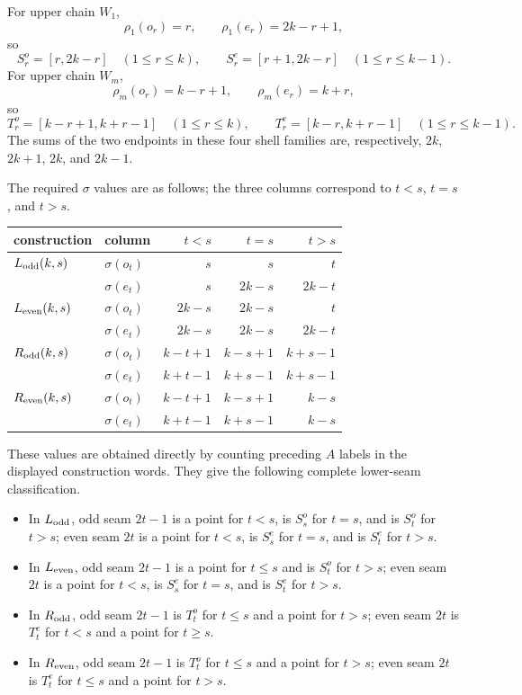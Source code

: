 \documentclass[11pt]{article}
\theoremstyle{definition}
\theoremstyle{remark}
\providecommand{\tightlist}{\setlength{\itemsep}{0pt}\setlength{\parskip}{0pt}}
\begin{document}
For upper chain $W_1$,
\[
\rho_1(o_r)=r,\qquad \rho_1(e_r)=2k-r+1,
\]
so
\[
S_r^o=[r,2k-r]\quad(1\le r\le k),\qquad
S_r^e=[r+1,2k-r]\quad(1\le r\le k-1).
\]
For upper chain $W_m$,
\[
\rho_m(o_r)=k-r+1,\qquad \rho_m(e_r)=k+r,
\]
so
\[
T_r^o=[k-r+1,k+r-1]\quad(1\le r\le k),\qquad
T_r^e=[k-r,k+r-1]\quad(1\le r\le k-1).
\]
The sums of the two endpoints in these four shell families are,
respectively, $2k$, $2k+1$, $2k$, and $2k-1$.

The required \(\sigma\) values are as follows; the three columns
correspond to \(t<s\), \(t=s\), and \(t>s\).

\begin{longtable}[]{@{}llrrr@{}}
\toprule\noalign{}
construction & column & \(t<s\) & \(t=s\) & \(t>s\) \\
\midrule\noalign{}
\endhead
\bottomrule\noalign{}
\endlastfoot
\(L_{\rm odd}(k,s)\) & \(\sigma(o_t)\) & \(s\) & \(s\) & \(t\) \\
& \(\sigma(e_t)\) & \(s\) & \(2k-s\) & \(2k-t\) \\
\(L_{\rm even}(k,s)\) & \(\sigma(o_t)\) & \(2k-s\) & \(2k-s\) & \(t\) \\
& \(\sigma(e_t)\) & \(2k-s\) & \(2k-s\) & \(2k-t\) \\
\(R_{\rm odd}(k,s)\) & \(\sigma(o_t)\) & \(k-t+1\) & \(k-s+1\) &
\(k+s-1\) \\
& \(\sigma(e_t)\) & \(k+t-1\) & \(k+s-1\) & \(k+s-1\) \\
\(R_{\rm even}(k,s)\) & \(\sigma(o_t)\) & \(k-t+1\) & \(k-s+1\) &
\(k-s\) \\
& \(\sigma(e_t)\) & \(k+t-1\) & \(k+s-1\) & \(k-s\) \\
\end{longtable}

These values are obtained directly by counting preceding \(A\) labels in
the displayed construction words. They give the following complete
lower-seam classification.

\begin{itemize}
\tightlist
\item
  In \(L_{\rm odd}\), odd seam \(2t-1\) is a point for \(t<s\), is
  \(S_s^o\) for \(t=s\), and is \(S_t^o\) for \(t>s\); even seam \(2t\)
  is a point for \(t<s\), is \(S_s^e\) for \(t=s\), and is \(S_t^e\) for
  \(t>s\).
\item
  In \(L_{\rm even}\), odd seam \(2t-1\) is a point for \(t\le s\) and
  is \(S_t^o\) for \(t>s\); even seam \(2t\) is a point for \(t<s\), is
  \(S_s^e\) for \(t=s\), and is \(S_t^e\) for \(t>s\).
\item
  In \(R_{\rm odd}\), odd seam \(2t-1\) is \(T_t^o\) for \(t\le s\) and
  a point for \(t>s\); even seam \(2t\) is \(T_t^e\) for \(t<s\) and a
  point for \(t\ge s\).
\item
  In \(R_{\rm even}\), odd seam \(2t-1\) is \(T_t^o\) for \(t\le s\) and
  a point for \(t>s\); even seam \(2t\) is \(T_t^e\) for \(t\le s\) and
  a point for \(t>s\).
\end{itemize}
\end{document}
